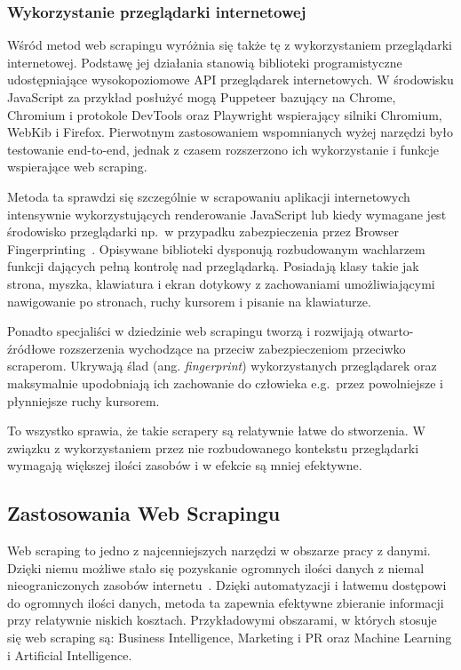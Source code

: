 \subsubsection{Wykorzystanie przeglądarki internetowej}\label{subsubsec:browser-scraping-theory}

Wśród metod web scrapingu wyróżnia się także tę z wykorzystaniem przeglądarki internetowej.
Podstawę jej działania stanowią biblioteki programistyczne udostępniające wysokopoziomowe API przeglądarek internetowych.
W środowisku JavaScript za przykład posłużyć mogą Puppeteer bazujący na Chrome, Chromium i protokole DevTools
oraz Playwright wspierający silniki Chromium, WebKib i Firefox.
Pierwotnym zastosowaniem wspomnianych wyżej narzędzi było testowanie end-to-end, jednak z czasem rozszerzono ich wykorzystanie i funkcje wspierające web scraping.

Metoda ta sprawdzi się szczególnie w scrapowaniu aplikacji internetowych intensywnie wykorzystujących renderowanie JavaScript
lub kiedy wymagane jest środowisko przeglądarki np.~w przypadku zabezpieczenia przez Browser Fingerprinting~\cite{apify-headless-browsers}.
Opisywane biblioteki dysponują rozbudowanym wachlarzem funkcji dających pełną kontrolę nad przeglądarką.
Posiadają klasy takie jak strona, myszka, klawiatura i ekran dotykowy z zachowaniami umożliwiającymi nawigowanie po stronach,
ruchy kursorem i pisanie na klawiaturze.

Ponadto specjaliści w dziedzinie web scrapingu tworzą i rozwijają otwarto-źródłowe rozszerzenia wychodzące na przeciw zabezpieczeniom przeciwko scraperom.
Ukrywają ślad (ang. \emph{fingerprint}) wykorzystanych przeglądarek oraz maksymalnie upodobniają ich zachowanie do człowieka e.g.~przez powolniejsze i płynniejsze ruchy kursorem.

To wszystko sprawia, że takie scrapery są relatywnie łatwe do stworzenia.
W związku z wykorzystaniem przez nie rozbudowanego kontekstu przeglądarki wymagają większej ilości zasobów i w efekcie są mniej efektywne.

\subsection{Zastosowania Web Scrapingu}\label{subsec:web-scraping-applications}

Web scraping to jedno z najcenniejszych narzędzi w obszarze pracy z danymi.
Dzięki niemu możliwe stało się pozyskanie ogromnych ilości danych z niemal nieograniczonych zasobów internetu~\cite{Zhao2017}.
Dzięki automatyzacji i łatwemu dostępowi do ogromnych ilości danych, metoda ta zapewnia efektywne zbieranie informacji przy relatywnie niskich kosztach.
Przykładowymi obszarami, w których stosuje się web scraping są: Business Intelligence, Marketing i PR oraz Machine Learning i Artificial Intelligence.


